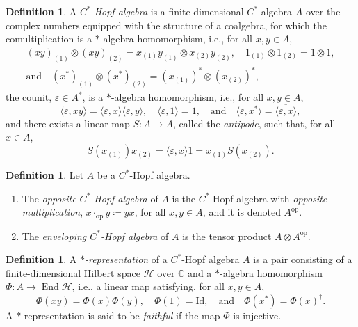 \documentclass[a4paper,10pt]{amsart}
\newcommand{\eval}[2]{\langle #1 , #2\rangle}
\newcommand{\newterm}[1]{\emph{#1}}
\theoremstyle{definition}
\newtheorem{definition}[theorem]{Definition}
\begin{document}
\begin{definition}
    \label{def:HA}
    A \newterm{$C^*$-Hopf algebra} is a finite-dimensional $C^*$-algebra $A$ over the complex numbers equipped with the structure of a coalgebra, for which the comultiplication is a $*$-algebra homomorphism, i.e., for all $x,y\in A$,
	\begin{gather}
        \label{eq:DeltaHomo}
        (xy)_{(1)} \otimes (xy)_{(2)}
        =
        x_{(1)} y_{(1)} \otimes x_{(2)} y_{(2)},
        \quad 
        1_{(1)}\otimes 1_{(2)}
        =
        1\otimes 1,
        \\
        \text{and}
        \quad
        (x^*)_{(1)}\otimes (x^*)_{(2)}
        =
        (x_{(1)})^* \otimes (x_{(2)})^*,
    \end{gather}
	the counit, $\varepsilon\in A^*$, is a $*$-algebra homomorphism, i.e., for all $x,y\in A$,
	\begin{equation}
        \label{eq:axiom_eps}
        \eval{\varepsilon}{xy} = \eval{\varepsilon}{x}\eval{\varepsilon}{y},
        \quad
        \eval{\varepsilon}{1}= 1,
        \quad 
        \text{and}
        \quad
        \eval{\varepsilon}{x^*}
        =
        \overline{\eval{\varepsilon}{x}},
    \end{equation}
	and there exists a linear map $S:A\to A$, called the \newterm{antipode}, such that, for all $x\in A$,
	\begin{equation}
		\label{eq:axiomSeps}
        S(x_{(1)}) x_{(2)}
        =
        \eval{\varepsilon}{x} 1
        =
        x_{(1)} S(x_{(2)}).
	\end{equation}
\end{definition}

\begin{definition}\label{def:Aop}
Let $A$ be a $C^*$-Hopf algebra.
\begin{enumerate}
\item[(i)]
The \newterm{opposite $C^*$-Hopf algebra} of $A$ is the $C^*$-Hopf algebra with \newterm{opposite multiplication}, $x\cdot_{\mathrm{op}} y \coloneqq y x$, for all $x,y\in A$, and it is denoted $A^{\mathrm{op}}$.
\item[(ii)]
The \newterm{enveloping $C^*$-Hopf algebra} of $A$ is the tensor product $A\otimes A^{\mathrm{op}}$.
\end{enumerate}
\end{definition}

\begin{definition}\label{def:rep}
    A \newterm{$*$-representation} of a $C^*$-Hopf algebra $A$ is a pair consisting of a fi\-ni\-te-di\-men\-sio\-nal Hilbert space $\mathscr{H}$ over $\mathbb{C}$ and a $*$-algebra homomorphism $\Phi:A\to\operatorname{End}\mathscr{H}$, i.e., a linear map satisfying, for all $x,y\in A$,
    \begin{equation}
        \Phi(x y) = \Phi(x) \Phi(y),
        \quad
        \Phi(1) = \mathrm{Id},
        \quad
        \text{and}
        \quad
        \Phi(x^*) = \Phi(x)^\dagger.
    \end{equation}
    A $*$-representation is said to be \newterm{faithful} if the map $\Phi$ is injective.
\end{definition}
\end{document}
